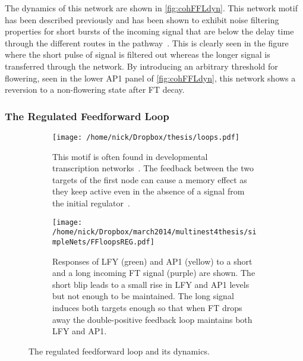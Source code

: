 The dynamics of this network are shown in \autoref{fig:cohFFLdyn}.
This network motif has been described previously and has been shown to exhibit noise filtering properties for short bursts of the incoming signal that are below the delay time through the different routes in the pathway~\cite{mangan2003,alon2006}.
This is clearly seen in the figure where the short pulse of signal is filtered out whereas the longer signal is transferred through the network.
By introducing an arbitrary threshold for flowering, seen in the lower AP1 panel of \autoref{fig:cohFFLdyn}, this network shows a reversion to a non-flowering state after FT decay.

\subsubsection{The Regulated Feedforward Loop}

\begin{figure*}[!htb]
\centering
\begin{subfigure}[b]{0.42\linewidth}
\texttt{[image: /home/nick/Dropbox/thesis/loops.pdf]}
\caption{
This motif is often found in developmental transcription networks~\cite{mangan2003}.
The feedback between the two targets of the first node can cause a memory effect as they keep active even in the absence of a signal from the initial regulator~\cite{alon2006}.
}
\label{fig:regFFL}
\end{subfigure}
\begin{subfigure}[b]{0.57\linewidth}
\texttt{[image: /home/nick/Dropbox/march2014/multinest4thesis/simpleNets/FFloopsREG.pdf]}
\caption{%
Responses of LFY (green) and AP1 (yellow) to a short and a long incoming FT signal (purple) are shown.
The short blip leads to a small rise in LFY and AP1 levels but not enough to be maintained.
The long signal induces both targets enough so that when FT drops away the double-positive feedback loop maintains both LFY and AP1.
}
\label{fig:regFFLdyn}
\end{subfigure}
\captionsetup{justification=centering}
\caption{The regulated feedforward loop and its dynamics.}%
\end{figure*}

